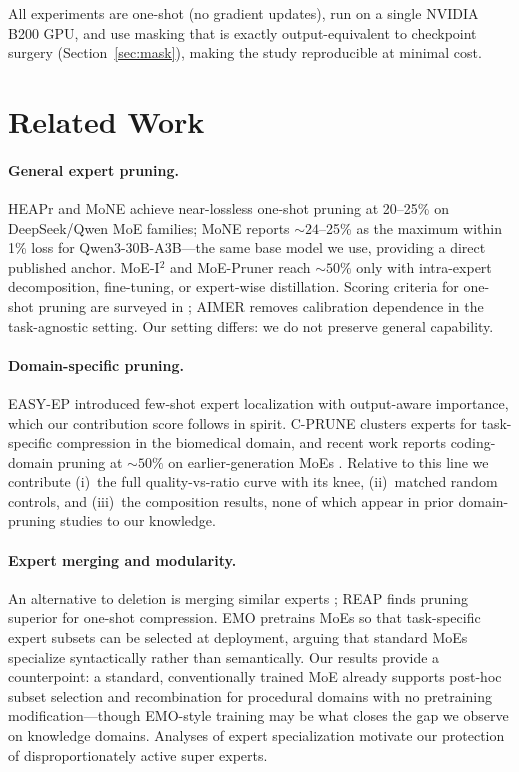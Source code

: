 \documentclass[11pt]{article}
\begin{document}
All experiments are one-shot (no gradient updates), run on a single NVIDIA
B200 GPU, and use masking that is exactly output-equivalent to checkpoint
surgery (Section~\ref{sec:mask}), making the study reproducible at minimal
cost.

\section{Related Work}

\paragraph{General expert pruning.} HEAPr \cite{heapr} and MoNE \cite{mone}
achieve near-lossless one-shot pruning at 20--25\% on DeepSeek/Qwen MoE
families; MoNE reports ${\sim}24$--25\% as the maximum within 1\% loss for
Qwen3-30B-A3B---the same base model we use, providing a direct published
anchor. MoE-I$^2$ \cite{moei2} and MoE-Pruner \cite{moepruner} reach
${\sim}50\%$ only with intra-expert decomposition, fine-tuning, or expert-wise
distillation. Scoring criteria for one-shot pruning are surveyed in
\cite{scoring}; AIMER \cite{aimer} removes calibration dependence in the
task-agnostic setting. Our setting differs: we do not preserve general
capability.

\paragraph{Domain-specific pruning.} EASY-EP \cite{easyep} introduced few-shot
expert localization with output-aware importance, which our contribution score
follows in spirit. C-PRUNE \cite{cprune} clusters experts for task-specific
compression in the biomedical domain, and recent work reports coding-domain
pruning at ${\sim}50\%$ on earlier-generation MoEs \cite{halfexperts}. Relative
to this line we contribute (i)~the full quality-vs-ratio curve with its knee,
(ii)~matched random controls, and (iii)~the composition results, none of which
appear in prior domain-pruning studies to our knowledge.

\paragraph{Expert merging and modularity.} An alternative to deletion is
merging similar experts \cite{hcsmoe,reap}; REAP \cite{reap} finds pruning
superior for one-shot compression. EMO \cite{emo} pretrains MoEs so that
task-specific expert subsets can be selected at deployment, arguing that
standard MoEs specialize syntactically rather than semantically. Our results
provide a counterpoint: a standard, conventionally trained MoE already supports
post-hoc subset selection and recombination for procedural domains with no
pretraining modification---though EMO-style training may be what closes the gap
we observe on knowledge domains. Analyses of expert specialization
\cite{whatgets,illusion,doexist} motivate our protection of disproportionately
active super experts.
\end{document}
